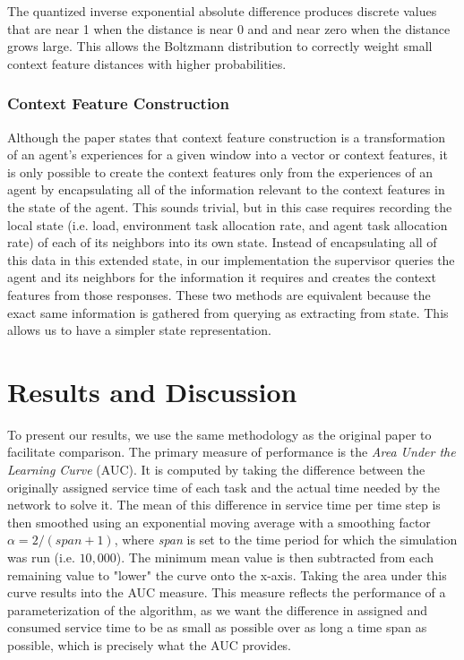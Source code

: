 \documentclass[letterpaper]{article}
\begin{document}
The quantized inverse exponential absolute difference produces discrete values that are near 1 when the distance is near 0 and and near zero when the distance grows large. This allows the Boltzmann distribution to correctly weight small context feature distances with higher probabilities.

\subsubsection{Context Feature Construction}
Although the paper states that context feature construction is a transformation of an agent's experiences for a given window into a vector or context features, it is only possible to create the context features only from the experiences of an agent by encapsulating all of the information relevant to the context features in the state of the agent. This sounds trivial, but in this case requires recording the local state (i.e. load, environment task allocation rate, and agent task allocation rate) of each of its neighbors into its own state. Instead of encapsulating all of this data in this extended state, in our implementation the supervisor queries the agent and its neighbors for the information it requires and creates the context features from those responses.  These two methods are equivalent because the exact same information is gathered from querying as extracting from state. This allows us to have a simpler state representation.

\section{Results and Discussion}
To present our results, we use the same methodology as the original paper to facilitate comparison. The primary measure of performance is the \textit{Area Under the Learning Curve} (AUC). It is computed by taking the difference between the originally assigned service time of each task and the actual time needed by the network to solve it. The mean of this difference in service time per time step is then smoothed using an exponential moving average with a smoothing factor $\alpha=2/(span+1)$, where \textit{span} is set to the time period for which the simulation was run (i.e. $10,000$). The minimum mean value is then subtracted from each remaining value to "lower" the curve onto the x-axis. Taking the area under this curve results into the AUC measure. This measure reflects the performance of a parameterization of the algorithm, as we want the difference in assigned and consumed service time to be as small as possible over as long a time span as possible, which is precisely what the AUC provides.
\end{document}
